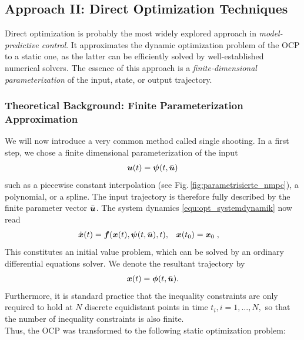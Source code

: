 \subsection{Approach II: Direct Optimization Techniques}\label{S:57.3.2}


Direct optimization is probably the most widely explored approach in \textit{model-predictive control}. It approximates the dynamic optimization problem of the OCP to a static one, as the latter can be efficiently solved by well-established numerical solvers. The essence of this approach is a \textit{finite-dimensional parameterization} of the input, state, or output trajectory.

\subsubsection{Theoretical Background: Finite Parameterization Approximation}\label{S:57.3.2.1}

We will now introduce a very common method called single shooting. In a first step, we chose a finite dimensional parameterization of the input
\begin{align*}
	\boldsymbol{u}(t) = \boldsymbol{\psi}(t,\bar{\boldsymbol{u}})
\end{align*}
such as a piecewise constant interpolation (see  Fig.\,\ref{fig:parametrisierte_nmpc}), a polynomial, or a spline. The input trajectory is therefore fully described by the finite parameter vector $\bar{\boldsymbol{u}}$. The system dynamics \eqref{equ:opt_systemdynamik} now read
\begin{align*}
	\dot{\boldsymbol{x}}(t) = \boldsymbol{f}(\boldsymbol{x}(t),\boldsymbol{\psi}(t,\bar{\boldsymbol{u}}),t), \quad &\boldsymbol{x}(t_0) = \boldsymbol{x}_0\; , 
\end{align*}
This constitutes an initial value problem, which can be solved by an ordinary differential equations solver. We denote the resultant trajectory by 
\begin{align*}
\boldsymbol{x}(t) = \boldsymbol{\phi}(t,\bar{\boldsymbol{u}}).
\end{align*}
Furthermore, it is standard practice that the inequality constraints are only required to hold at $N$ discrete equidistant points in time $t_i,i=1,\dots,N,$ so that the number of inequality constraints is also finite. \\
Thus, the OCP was transformed to the following static optimization problem: \\

